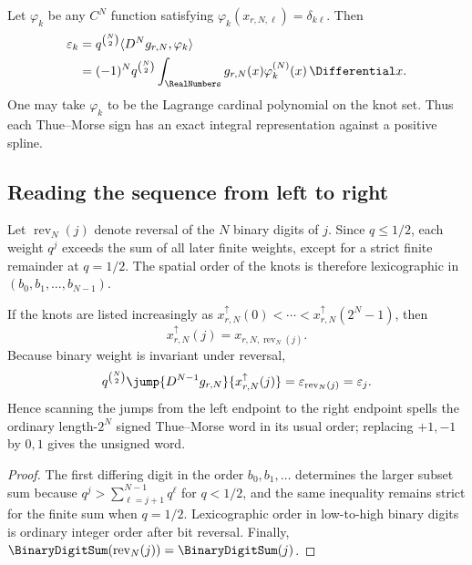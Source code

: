 \documentclass[11pt]{article}
\theoremstyle{definition}
\theoremstyle{remark}
\newcommand{\eps}{\varepsilon}
\begin{document}
\begin{corollary}
\label{p5:cor:smooth-TM-extraction}
Let $\varphi_k$ be any $C^N$ function satisfying
$\varphi_k(x_{r,N,\ell})=\delta_{k\ell}$.  Then
\begin{align}
 \eps_k
 &=q^{\binom N2}\langle D^Ng_{r,N},\varphi_k\rangle       \label{p5:eq:eps-test-function}\\
 &=(-1)^Nq^{\binom N2}
   \int_{\RealNumbers}g_{r,N}(x)\varphi_k^{(N)}(x)\,\Differential x.          \label{p5:eq:eps-integral-extraction}
\end{align}
One may take $\varphi_k$ to be the Lagrange cardinal polynomial on the knot
set.  Thus each Thue--Morse sign has an exact integral representation against a
positive spline.
\end{corollary}

\subsection{Reading the sequence from left to right}

Let $\operatorname{rev}_N(j)$ denote reversal of the $N$ binary digits of
$j$.  Since $q\le1/2$, each weight $q^j$ exceeds the sum of all later finite
weights, except for a strict finite remainder at $q=1/2$.  The spatial order of
the knots is therefore lexicographic in $(b_0,b_1,\ldots,b_{N-1})$.

\begin{proposition}
\label{p5:prop:bit-reversal-order}
If the knots are listed increasingly as
$x_{r,N}^{\uparrow}(0)<\cdots<x_{r,N}^{\uparrow}(2^N-1)$, then
\begin{equation}
 x_{r,N}^{\uparrow}(j)=x_{r,N,\operatorname{rev}_N(j)}.    \label{p5:eq:knot-bit-reversal}
\end{equation}
Because binary weight is invariant under reversal,
\begin{equation}
 q^{\binom N2}
 \jump{D^{N-1}g_{r,N}}{x_{r,N}^{\uparrow}(j)}
 =\eps_{\operatorname{rev}_N(j)}=\eps_j.                  \label{p5:eq:spatial-TM}
\end{equation}
Hence scanning the jumps from the left endpoint to the right endpoint spells
the ordinary length-$2^N$ signed Thue--Morse word in its usual order; replacing
$+1,-1$ by $0,1$ gives the unsigned word.
\end{proposition}

\begin{proof}
The first differing digit in the order $b_0,b_1,\ldots$ determines the larger
subset sum because
$q^j>\sum_{\ell=j+1}^{N-1}q^\ell$ for $q<1/2$, and the same inequality remains
strict for the finite sum when $q=1/2$.  Lexicographic order in low-to-high
binary digits is ordinary integer order after bit reversal.  Finally,
$\BinaryDigitSum(\operatorname{rev}_N(j))=\BinaryDigitSum(j)$.
\end{proof}
\end{document}
